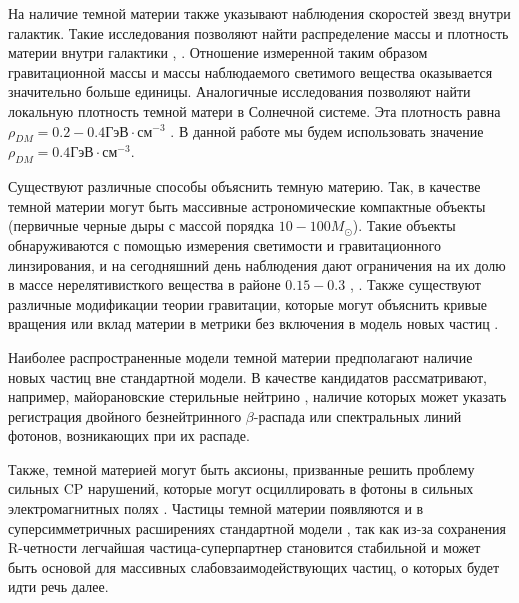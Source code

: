 На наличие темной материи также указывают наблюдения скоростей звезд внутри галактик. Такие исследования позволяют найти распределение массы и плотность материи внутри галактики \cite{Radial_velocity_measurements}, \cite{Angular_Velocity}. Отношение измеренной таким образом гравитационной массы и массы наблюдаемого светимого вещества оказывается значительно больше единицы. Аналогичные исследования позволяют найти локальную плотность темной матери в Солнечной системе. Эта плотность равна $\rho_{DM} = 0.2 - 0.4 \text{ГэВ} \cdot \text{см}^{-3}$ \cite{palau2022oblateness}. В данной работе мы будем использовать значение  $\rho_{DM} = 0.4 \text{ГэВ} \cdot  \text{см}^{-3}$.


Существуют различные способы объяснить темную материю. Так, в качестве темной материи могут быть массивные астрономические компактные объекты (первичные черные дыры с массой порядка $10-100M_{\odot}$). Такие объекты обнаруживаются с помощью измерения светимости и гравитационного линзирования, и на сегодняшний день наблюдения дают ограничения на их долю в массе нерелятивисткого вещества в районе $0.15-0.3$ \cite{Zumalac_rregui_2018}, \cite{Blaineau_2022}.
Также существуют различные модификации теории гравитации, которые могут объяснить кривые вращения или вклад материи в метрики без включения в модель новых частиц \cite{1984ApJ...286....7B}.


Наиболее распространенные модели темной материи предполагают наличие новых частиц вне стандартной модели. В качестве кандидатов рассматривают, например, майорановские стерильные нейтрино \cite{Boyarsky_2019}, наличие которых может указать регистрация двойного безнейтринного $\beta$-распада или спектральных линий фотонов, возникающих при их распаде. 

Также, темной материей могут быть аксионы, призванные решить проблему сильных CP нарушений, которые могут осциллировать в фотоны в сильных электромагнитных полях \cite{adams2023axion}. Частицы темной материи появляются и в суперсимметричных расширениях стандартной	 модели \cite{berezinsky1996dark}, так как из-за сохранения R-четности легчайшая частица-суперпартнер становится стабильной и может быть основой для массивных слабовзаимодействующих частиц, о которых будет идти речь далее.

